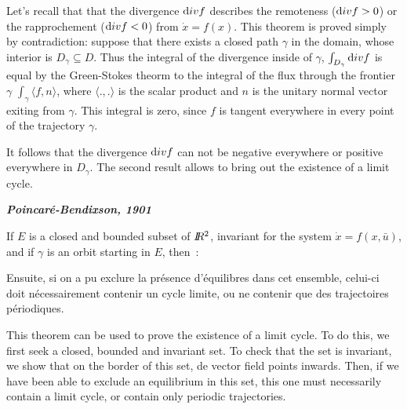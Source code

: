 Let's recall that that the divergence ${\mbox div}f$ describes the remoteness (${\mbox div}f >0$) or the rapprochement (${\mbox div}f <0$) from $\dot{x}=f(x)$.
This theorem is proved simply by contradiction: suppose that there exists a closed path $\gamma$ in the domain, whose interior is $D_{\gamma} \subseteq D$.
Thus the integral of the divergence inside of $\gamma$, $\int_{D_\gamma}  {\mbox div}f$ is equal by the Green-Stokes theorm to the integral
of the flux through the frontier $\gamma$ $\int_\gamma \langle f, n \rangle$, where $\langle.,.\rangle$
is the scalar product and $n$ is the unitary normal vector exiting from $\gamma$.
This integral is zero, since $f$ is tangent everywhere in every point of the trajectory $\gamma$. 

It follows that the divergence ${\mbox div}f$ can not be negative everywhere or positive everywhere in $D_{\gamma}$.
The second result allows to bring out the existence of a limit cycle.

\begin{theoreme} {\bf \em Poincar{é}-Bendixson, 1901}

If $E$ is a closed and bounded subset of $I \! \! R^2$, invariant for the system $\dot x= f(x,\bar u)$, and if $\gamma$ is an orbit
starting in $E$, then~:

\end{theoreme}


Ensuite, si on a pu exclure la
pr{é}sence d'{é}quilibres dans cet ensemble, celui-ci doit n{é}cessairement contenir un
cycle limite, ou ne contenir que des trajectoires p{é}riodiques.

This theorem can be used to prove the existence of a limit cycle. To do this, we first seek a closed, bounded and invariant set.
To check that the set is invariant, we show that on the border of this set, de vector field points inwards. Then, if we have been 
able to exclude an equilibrium in this set, this one must necessarily contain a limit cycle, or contain only periodic trajectories.

